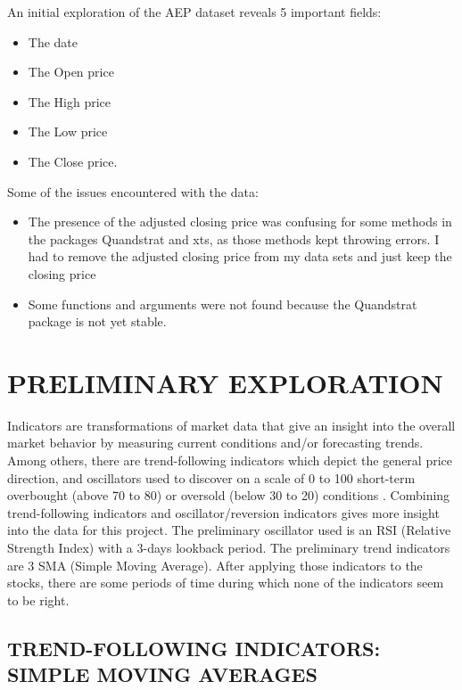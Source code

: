 \documentclass[12pt,]{article}
\providecommand{\tightlist}{%
  \setlength{\itemsep}{0pt}\setlength{\parskip}{0pt}}
\begin{document}
An initial exploration of the AEP dataset reveals 5 important fields:

\begin{itemize}
\tightlist
\item
  The date
\item
  The Open price
\item
  The High price
\item
  The Low price
\item
  The Close price.
\end{itemize}

Some of the issues encountered with the data:

\begin{itemize}
\tightlist
\item
  The presence of the adjusted closing price was confusing for some
  methods in the packages Quandstrat and xts, as those methods kept
  throwing errors. I had to remove the adjusted closing price from my
  data sets and just keep the closing price
\item
  Some functions and arguments were not found because the Quandstrat
  package is not yet stable.
\end{itemize}

\section{PRELIMINARY EXPLORATION}\label{preliminary-exploration}

Indicators are transformations of market data that give an insight into
the overall market behavior by measuring current conditions and/or
forecasting trends. Among others, there are trend-following indicators
which depict the general price direction, and oscillators used to
discover on a scale of 0 to 100 short-term overbought (above 70 to 80)
or oversold (below 30 to 20) conditions . Combining trend-following
indicators and oscillator/reversion indicators gives more insight into
the data for this project. The preliminary oscillator used is an RSI
(Relative Strength Index) with a 3-days lookback period. The preliminary
trend indicators are 3 SMA (Simple Moving Average). After applying those
indicators to the stocks, there are some periods of time during which
none of the indicators seem to be right.

\subsection{TREND-FOLLOWING INDICATORS: SIMPLE MOVING
AVERAGES}\label{trend-following-indicators-simple-moving-averages}
\end{document}

